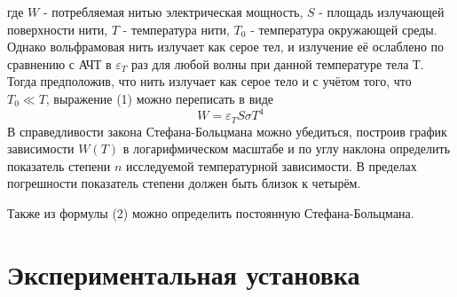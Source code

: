 \documentclass[a4paper,12pt]{article} %
\begin{document}
		где $W$ - потребляемая нитью электрическая мощность, $S$ - площадь излучающей поверхности нити, $T$ - температура нити, $T_0$ - температура окружающей среды. Однако вольфрамовая нить излучает как серое тел, и излучение её ослаблено по сравнению с АЧТ в $\varepsilon_T$ раз для любой волны при данной температуре тела Т. Тогда предположив, что нить излучает как серое тело и с учётом того, что $T_0 \ll T$, выражение (1) можно переписать в виде
		\begin{equation}
			W = \varepsilon_T S \sigma T^4
		\end{equation}
		В справедливости закона Стефана-Больцмана можно убедиться, построив график зависимости $W(T)$ в логарифмическом масштабе и по углу наклона определить показатель степени $n$ исследуемой температурной зависимости. В пределах погрешности показатель степени должен быть близок к четырём. \par
		Также из формулы (2) можно определить постоянную Стефана-Больцмана.


	\section{Экспериментальная установка}
\end{document}

